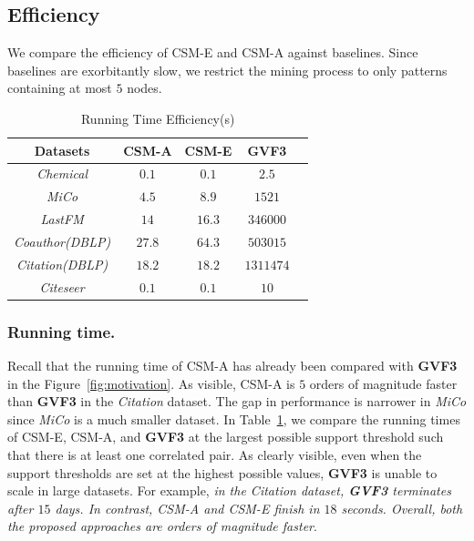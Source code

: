 \subsection{Efficiency}
\label{subsec:efficiency}
We compare the efficiency of {\sf CSM-E} and {\sf CSM-A} against baselines. Since baselines are exorbitantly slow, we %
restrict the mining process to only patterns containing at most $5$ nodes. %
%
\begin{table}[b]
	\vspace{-1mm}
		\centering
		\caption{Running Time Efficiency(s)\label{tab:gvf3}}
{\scriptsize
		\begin{tabular} {ccccc}
			\hline
			Datasets  & {\sf CSM-A} & {\sf CSM-E} & \textbf{GVF3}\\			
			\hline
			{\em Chemical}   &   $0.1$    &  $0.1$ & $2.5$\\
			{\em MiCo}   &   $4.5$    &  $8.9$   & $1521$\\
			{\em LastFM}   &   $14$   &  $16.3$ & $346000$\\
			{\em Coauthor(DBLP)}   &   $27.8$    &  $64.3$& $503015$\\
			{\em Citation(DBLP)}   &   $18.2$   &  $18.2$ & $1311474$\\
			{\em Citeseer}   &   $0.1$   &  $0.1$ & $10$\\
			\hline
		\end{tabular}}
	\vspace{-2mm}
\end{table}
\vspace{-0.1in}
\subsubsection{Running time. }
Recall that the running time of {\sf CSM-A} has already been compared with \textbf{GVF3} in the Figure~\ref{fig:motivation}. As visible, {\sf CSM-A} is $5$ orders of magnitude faster than \textbf{GVF3} in the {\em Citation} dataset. The gap in performance is narrower in {\em MiCo} since {\em MiCo} is a much smaller dataset. In Table~\ref{tab:gvf3}, we compare the running times of {\sf CSM-E}, {\sf CSM-A}, and \textbf{GVF3} at the largest possible support threshold such that there is at least one correlated pair. As clearly visible, even when the support thresholds are set at the highest possible values, \textbf{GVF3} is unable to scale in large datasets. For example, {\em in the {\em Citation} dataset, \textbf{GVF3} terminates after $15$ days. In contrast, {\sf CSM-A} and {\sf CSM-E} finish in $18$ seconds. Overall, both the proposed approaches are orders of magnitude faster}.

